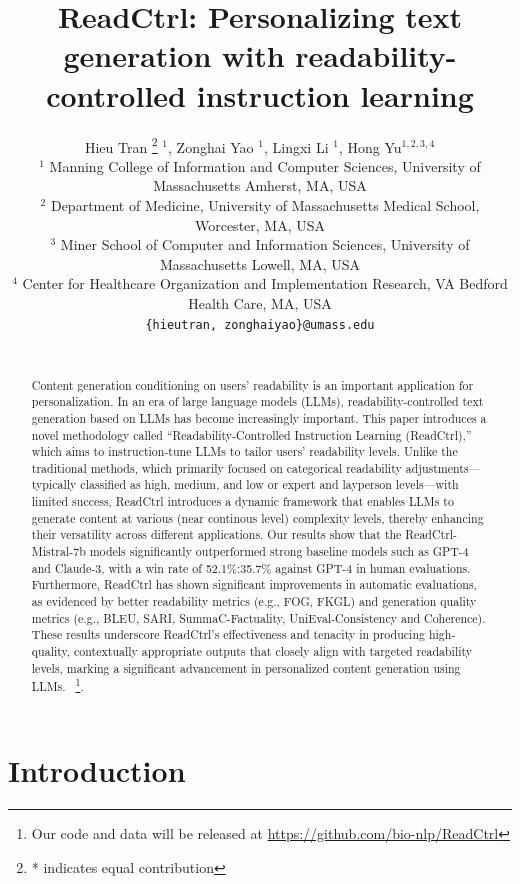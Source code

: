 \documentclass[11pt]{article}
\title{ReadCtrl: Personalizing text generation with readability-controlled instruction learning}
\author{Hieu Tran \thanks{* indicates equal contribution} $^1$, Zonghai Yao \footnotemark[1] $^1$, Lingxi Li  $^1$, Hong Yu$^{1, 2, 3, 4}$\\
$^1$ Manning College of Information and Computer Sciences, University of Massachusetts Amherst, MA, USA\\
    $^2$ Department of Medicine, University of Massachusetts Medical School, Worcester, MA, USA\\
    $^3$ Miner School of Computer and Information Sciences, University of Massachusetts Lowell, MA, USA\\
    $^4$ Center for Healthcare Organization and Implementation Research, VA Bedford Health Care, MA, USA\\
  {\tt \{hieutran, zonghaiyao\}@umass.edu}\\ 
  \\
}
\begin{document}
\maketitle
\begin{abstract}
Content generation conditioning on users' readability is an important application for personalization.
In an era of large language models (LLMs), readability-controlled text generation based on LLMs has become increasingly important. 
This paper introduces a novel methodology called ``Readability-Controlled Instruction Learning (ReadCtrl),'' 
which aims to instruction-tune LLMs to tailor users' readability levels.
Unlike the traditional methods, which primarily focused on categorical readability adjustments—typically classified as high, medium, and low or expert and layperson levels—with limited success, ReadCtrl introduces a dynamic framework that enables LLMs to generate content at various (near continous level) complexity levels, thereby enhancing their versatility across different applications.
Our results show that the ReadCtrl-Mistral-7b models significantly outperformed strong baseline models such as GPT-4 and Claude-3, with a win rate of 52.1\%:35.7\% against GPT-4 in human evaluations.
Furthermore, ReadCtrl has shown significant improvements in automatic evaluations, as evidenced by better readability metrics (e.g., FOG, FKGL) and generation quality metrics (e.g., BLEU, SARI, SummaC-Factuality,  UniEval-Consistency and Coherence).
These results underscore ReadCtrl's effectiveness and tenacity in producing high-quality, contextually appropriate outputs that closely align with targeted readability levels, marking a significant advancement in personalized content generation using LLMs.
~\footnote{Our code and data will be released at \url{https://github.com/bio-nlp/ReadCtrl}}.
\end{abstract}

\section{Introduction}
\label{Intro}
\end{document}
